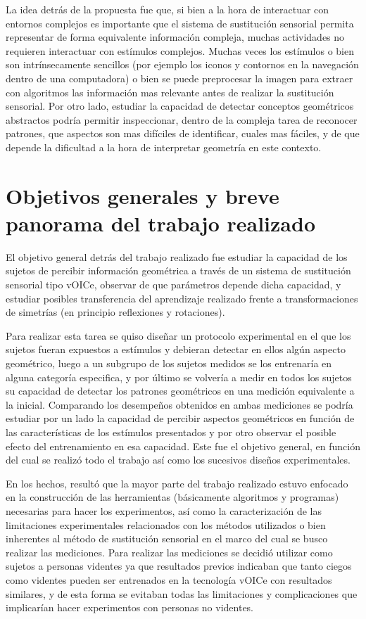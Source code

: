 \documentclass{article}
\begin{document}
    La idea detrás de la propuesta fue que, si bien a la hora de interactuar con entornos complejos es importante que el sistema de sustitución sensorial permita representar de forma equivalente información compleja, muchas actividades no requieren interactuar con estímulos complejos. Muchas veces los estímulos o bien son intrínsecamente sencillos (por ejemplo los iconos y contornos en la navegación dentro de una computadora) o bien se puede preprocesar la imagen para extraer con algoritmos las información mas relevante antes de realizar la sustitución sensorial. Por otro lado, estudiar la capacidad de detectar conceptos geométricos abstractos podría permitir inspeccionar, dentro de la compleja tarea de reconocer patrones, que aspectos son mas difíciles de identificar, cuales mas fáciles, y de que depende la dificultad a la hora de interpretar geometría en este contexto. 

\section{Objetivos generales y breve panorama del trabajo realizado} \label{seccion:panorama}

    El objetivo general detrás del trabajo realizado fue estudiar la capacidad de los sujetos de percibir información geométrica a través de un sistema de sustitución sensorial tipo vOICe, observar de que parámetros depende dicha capacidad, y estudiar posibles transferencia del aprendizaje realizado frente a transformaciones de simetrías (en principio reflexiones y rotaciones). 
    
    Para realizar esta tarea se quiso diseñar un protocolo experimental en el que los sujetos fueran expuestos a estímulos y debieran detectar en ellos algún aspecto geométrico, luego a un subgrupo de los sujetos medidos se los entrenaría en alguna categoría especifica, y por último se volvería a medir en todos los sujetos su capacidad de detectar los patrones geométricos en una medición equivalente a la inicial. Comparando los desempeños obtenidos en ambas mediciones se podría estudiar por un lado la capacidad de percibir aspectos geométricos en función de las características de los estímulos presentados y por otro observar el posible efecto del entrenamiento en esa capacidad. Este fue el objetivo general, en función del cual se realizó todo el trabajo así como los sucesivos diseños experimentales. 
    
    En los hechos, resultó que la mayor parte del trabajo realizado estuvo enfocado en la construcción de las herramientas (básicamente algoritmos y programas) necesarias para hacer los experimentos, así como la caracterización de las limitaciones experimentales relacionados con los métodos utilizados o bien inherentes al método de sustitución sensorial en el marco del cual se busco realizar las mediciones. Para realizar las mediciones se decidió utilizar como sujetos a personas videntes ya que resultados previos\cite{VoiceEntrenamiento3} indicaban que tanto ciegos como videntes pueden ser entrenados en la tecnología vOICe con resultados similares, y de esta forma se evitaban todas las limitaciones y complicaciones que implicarían hacer experimentos con personas no videntes.
    
\end{document}
